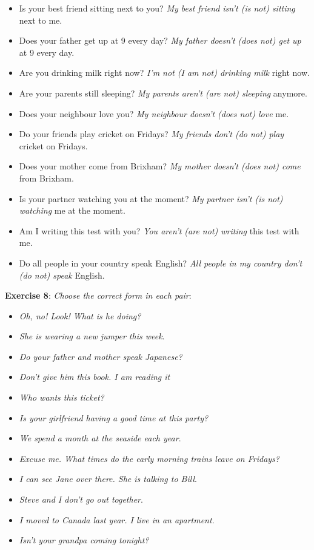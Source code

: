 \begin{itemize}

\item Is your best friend sitting next to you? \textit{My best friend isn't (is not) sitting} next to me.
\item Does your father get up at 9 every day? \textit{My father doesn't (does not) get up} at 9 every day.
\item Are you drinking milk right now? \textit{I'm not (I am not) drinking milk} right now.
\item Are your parents still sleeping? \textit{My parents aren't (are not) sleeping} anymore.
\item Does your neighbour love you? \textit{My neighbour doesn't (does not) love} me.
\item Do your friends play cricket on Fridays? \textit{My friends don't (do not) play} cricket on Fridays.
\item Does your mother come from Brixham? \textit{My mother doesn't (does not) come} from Brixham.
\item Is your partner watching you at the moment? \textit{My partner isn't (is not) watching} me at the moment.
\item Am I writing this test with you? \textit{You aren't (are not) writing} this test with me.
\item Do all people in your country speak English? \textit{All people in my country don't (do not) speak} English.

\end{itemize}

\textbf{Exercise 8}: \textit{Choose the correct form in each pair}:

\begin{itemize}

\item \textit{Oh, no! Look! What is he doing?}
\item \textit{She is wearing a new jumper this week}.
\item \textit{Do your father and mother speak Japanese?}
\item \textit{Don't give him this book. I am reading it}
\item \textit{Who wants this ticket?}
\item \textit{Is your girlfriend having a good time at this party?}
\item \textit{We spend a month at the seaside each year}.
\item \textit{Excuse me. What times do the early morning trains leave on Fridays?}
\item \textit{I can see Jane over there. She is talking to Bill}.
\item \textit{Steve and I don't go out together}.
\item \textit{I moved to Canada last year. I live in an apartment}.
\item \textit{Isn't your grandpa coming tonight?}

\end{itemize}

